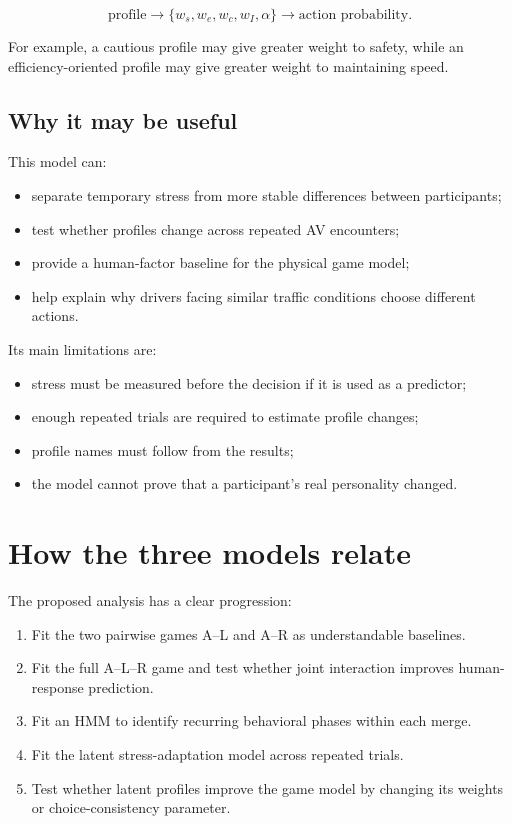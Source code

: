\documentclass[11pt,a4paper]{article}
\begin{document}
\begin{equation}
\text{profile}
\longrightarrow
\{w_s,w_e,w_c,w_I,\alpha\}
\longrightarrow
\text{action probability}.
\end{equation}

For example, a cautious profile may give greater weight to safety, while an efficiency-oriented profile may give greater weight to maintaining speed.

\subsection{Why it may be useful}

This model can:

\begin{itemize}[noitemsep]
  \item separate temporary stress from more stable differences between participants;
  \item test whether profiles change across repeated AV encounters;
  \item provide a human-factor baseline for the physical game model;
  \item help explain why drivers facing similar traffic conditions choose different actions.
\end{itemize}

Its main limitations are:

\begin{itemize}[noitemsep]
  \item stress must be measured before the decision if it is used as a predictor;
  \item enough repeated trials are required to estimate profile changes;
  \item profile names must follow from the results;
  \item the model cannot prove that a participant's real personality changed.
\end{itemize}

\section{How the three models relate}

The proposed analysis has a clear progression:

\begin{enumerate}
  \item Fit the two pairwise games A--L and A--R as understandable baselines.
  \item Fit the full A--L--R game and test whether joint interaction improves human-response prediction.
  \item Fit an HMM to identify recurring behavioral phases within each merge.
  \item Fit the latent stress-adaptation model across repeated trials.
  \item Test whether latent profiles improve the game model by changing its weights or choice-consistency parameter.
\end{enumerate}
\end{document}
